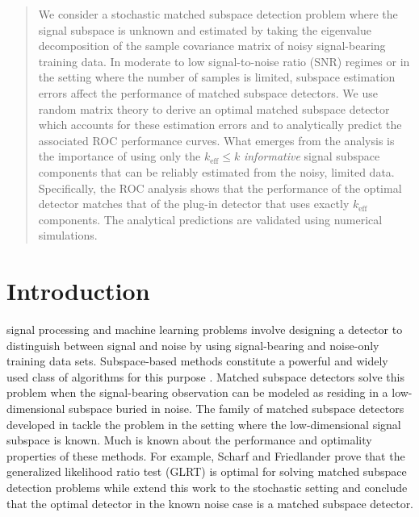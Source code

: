 \begin{abstract}
We consider a stochastic  matched subspace detection problem where the signal subspace is unknown and estimated by taking the eigenvalue decomposition of the sample covariance matrix of noisy signal-bearing training data. In moderate to low signal-to-noise ratio (SNR) regimes or in the setting where the number of samples is limited, subspace estimation errors affect the performance of matched subspace detectors. We use random matrix theory to derive an optimal matched subspace detector which accounts for these estimation errors and to analytically predict the associated ROC performance curves. What emerges from the analysis is the importance of using only the $k_\text{eff} \leq k$ \textit{informative} signal subspace components that can be reliably estimated from the noisy, limited data. Specifically, the ROC analysis shows that the performance of the optimal detector matches that of the plug-in detector that uses exactly $k_\text{eff}$ components. The analytical predictions are validated using numerical simulations.
\end{abstract}

\section{Introduction}

 signal processing and machine learning problems involve designing a detector to distinguish between signal and noise by using signal-bearing and noise-only training data sets. Subspace-based methods constitute a powerful and widely used class of algorithms for this purpose \cite{hastie2001elements,laaksonen1996subspace,scharf1994matched,jin2005cfar,mcwhorter2003matched}. Matched subspace detectors  solve this problem when the signal-bearing observation can be modeled as residing in a low-dimensional subspace buried in noise. The family of matched subspace detectors developed in \cite{scharf1994matched,jin2005cfar,mcwhorter2003matched} tackle the problem in the setting where the low-dimensional signal subspace is known. Much is known about the performance and optimality properties of these methods. For example, Scharf and Friedlander \cite{scharf1994matched} prove that the generalized likelihood ratio test (GLRT) is optimal for solving matched subspace detection problems while \cite{mcwhorter2003matched} extend this work to the stochastic setting and conclude that the optimal detector in the known noise case is a matched subspace detector.

